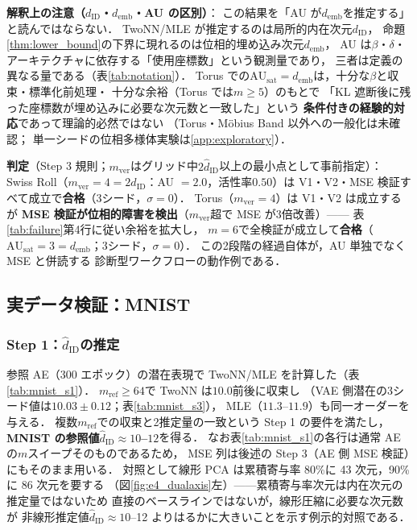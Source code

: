 \documentclass[11pt,a4paper]{jsarticle}
\newcommand{\dID}{d_{\mathrm{ID}}}
\newcommand{\hatdID}{\hat{d}_{\mathrm{ID}}}
\newcommand{\AUsat}{\mathrm{AU}_{\mathrm{sat}}}
\newcommand{\demb}{d_{\mathrm{emb}}}
\begin{document}
\textbf{解釈上の注意（$\dID$・$\demb$・AU の区別）}：
この結果を「AU が$\demb$を推定する」と読んではならない．
TwoNN/MLE が推定するのは局所的内在次元$\dID$，
命題\ref{thm:lower_bound}の下界に現れるのは位相的埋め込み次元$\demb$，
AU は$\beta$・$\delta$・アーキテクチャに依存する「使用座標数」という観測量であり，
三者は定義の異なる量である（表\ref{tab:notation}）．
Torus での$\AUsat = \demb$は，十分な$\beta$と収束・標準化前処理・
十分な余裕（Torus では$m \geq 5$）のもとで
「KL 遮断後に残った座標数が埋め込みに必要な次元数と一致した」という
\textbf{条件付きの経験的対応}であって理論的必然ではない
（Torus・M\"obius Band 以外への一般化は未確認；
単一シードの位相多様体実験は\ref{app:exploratory}）．

\textbf{判定}（Step 3 規則；$m_{\mathrm{ver}}$はグリッド中$2\hatdID$以上の最小点として事前指定）：
Swiss Roll（$m_{\mathrm{ver}} = 4 = 2\hatdID$：AU $= 2.0$，活性率$0.50$）は
V1・V2・MSE 検証すべて成立で\textbf{合格}（3シード，$\sigma = 0$）．
Torus（$m_{\mathrm{ver}} = 4$）は V1・V2 は成立するが
\textbf{MSE 検証が位相的障害を検出}（$m_{\mathrm{ver}}$超で MSE が3倍改善）——
表\ref{tab:failure}第4行に従い余裕を拡大し，
$m = 6$で全検証が成立して\textbf{合格}（$\AUsat = 3 = \demb$；3シード，$\sigma = 0$）．
この2段階の経過自体が，AU 単独でなく MSE と併読する
診断型ワークフローの動作例である．

\subsection{実データ検証：MNIST}\label{sec:exp_mnist}

\subsubsection{Step 1：$\hatdID$の推定}

参照 AE（300 エポック）の潜在表現で TwoNN/MLE を計算した（表\ref{tab:mnist_s1}）．
$m_{\mathrm{ref}} \geq 64$で TwoNN は$10.0$前後に収束し
（VAE 側潜在の3シード値は$10.03 \pm 0.12$；表\ref{tab:mnist_s3}），
MLE（$11.3$--$11.9$）も同一オーダーを与える．
複数$m_{\mathrm{ref}}$での収束と2推定量の一致という Step 1 の要件を満たし，
\textbf{MNIST の参照値$\hatdID \approx 10$--$12$}を得る．
なお表\ref{tab:mnist_s1}の各行は通常 AE の$m$スイープそのものであるため，
MSE 列は後述の Step 3（AE 側 MSE 検証）にもそのまま用いる．
対照として線形 PCA は累積寄与率 80\%に 43 次元，90\%に 86 次元を要する
（図\ref{fig:e4_dualaxis}左）——累積寄与率次元は内在次元の推定量ではないため
直接のベースラインではないが，線形圧縮に必要な次元数が
非線形推定値$\hatdID \approx 10$--12 よりはるかに大きいことを示す例示的対照である．
\end{document}
